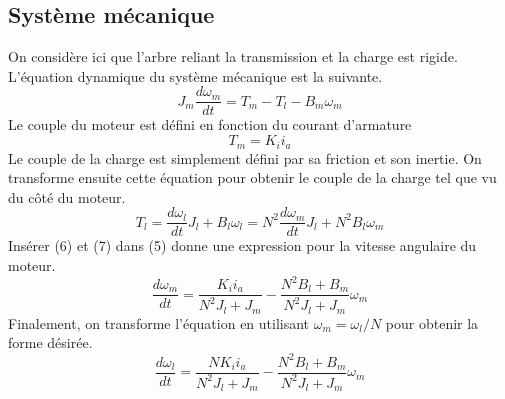 \documentclass{udes_rapport} %
\begin{document}
\subsection{Système mécanique}
On considère ici que l'arbre reliant la transmission et la charge est rigide.
L'équation dynamique du système mécanique est la suivante.
\begin{equation}
J_m\frac{d\omega_m}{dt} = T_m - T_l - B_m\omega_m
\end{equation}
Le couple du moteur est défini en fonction du courant d'armature
\begin{equation}
T_m = K_ii_a
\end{equation}
Le couple de la charge est simplement défini par sa friction et son inertie. On transforme ensuite cette équation pour obtenir le couple de la charge 
tel que vu du côté du moteur.
\begin{equation}
T_l = \frac{d\omega_l}{dt}J_l + B_l\omega_l = N^2\frac{d\omega_m}{dt}J_l + N^2B_l\omega_m
\end{equation} 
Insérer (6) et (7) dans (5) donne une expression pour la vitesse angulaire du moteur.
\[ \frac{d\omega_m}{dt} = \frac{K_ii_a}{N^2J_l + J_m} - \frac{N^2B_l + B_m}{N^2J_l + J_m}\omega_m \]
Finalement, on transforme l'équation en utilisant $\omega_m = \omega_l/N$ pour obtenir la forme désirée.
\begin{equation}
\frac{d\omega_l}{dt} = \frac{NK_ii_a}{N^2J_l + J_m} - \frac{N^2B_l + B_m}{N^2J_l + J_m}\omega_m
\end{equation} 
\end{document}
